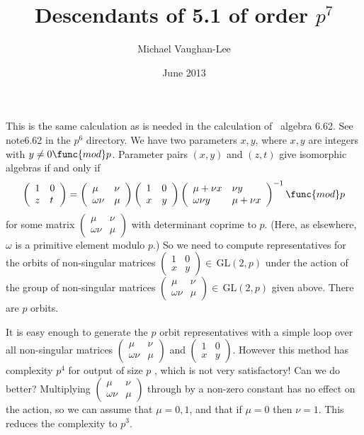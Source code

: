 \documentclass[12pt]{article}
\begin{document}
\title{Descendants of 5.1 of order $p^{7}$}
\author{Michael Vaughan-Lee}
\date{June 2013}
\maketitle

This is the same calculation as is needed in the calculation of \ algebra
6.62. See note6.62 in the $p^{6}$ directory. We have two parameters $x,y$,
where $x,y$ are integers with $y\neq 0\func{mod}p$. Parameter pairs $(x,y)$
and $(z,t)$ give isomorphic algebras if and only if%
\[
\left( 
\begin{array}{ll}
1 & 0 \\ 
z & t%
\end{array}%
\right) =\left( 
\begin{array}{ll}
\mu  & \nu  \\ 
\omega \nu  & \mu 
\end{array}%
\right) \left( 
\begin{array}{ll}
1 & 0 \\ 
x & y%
\end{array}%
\right) \left( 
\begin{array}{ll}
\mu +\nu x & \nu y \\ 
\omega \nu y & \mu +\nu x%
\end{array}%
\right) ^{-1}\func{mod}p
\]%
for some matrix $\left( 
\begin{array}{ll}
\mu  & \nu  \\ 
\omega \nu  & \mu 
\end{array}%
\right) $ with determinant coprime to $p$. (Here, as elsewhere, $\omega $ is
a primitive element modulo $p$.) So we need to compute representatives for
the orbits of non-singular matrices $\left( 
\begin{array}{ll}
1 & 0 \\ 
x & y%
\end{array}%
\right) \in \,$GL$(2,p)$ under the action of the group of non-singular
matrices $\left( 
\begin{array}{ll}
\mu  & \nu  \\ 
\omega \nu  & \mu 
\end{array}%
\right) \in \,$GL$(2,p)$ given above. There are $p$ orbits.

It is easy enough to generate the $p$ orbit representatives with a simple
loop over all non-singular matrices $\left( 
\begin{array}{ll}
\mu & \nu \\ 
\omega \nu & \mu%
\end{array}%
\right) $ and $\left( 
\begin{array}{ll}
1 & 0 \\ 
x & y%
\end{array}%
\right) $. However this method has complexity $p^{4}$ for output of size $p$%
, which is not very satisfactory! Can we do better? Multiplying $\left( 
\begin{array}{ll}
\mu & \nu \\ 
\omega \nu & \mu%
\end{array}%
\right) $ through by a non-zero constant has no effect on the action, so we
can assume that $\mu =0,1$, and that if $\mu =0$ then $\nu =1$. This reduces
the complexity to $p^{3}$.
\end{document}
